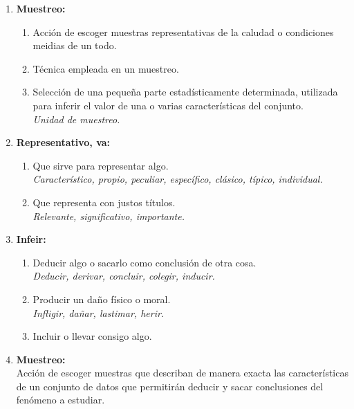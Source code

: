 \begin{enumerate}
\item \textbf{Muestreo: }
    \begin{enumerate}
        \item Acción de escoger muestras representativas de la caludad o condiciones meidias de un todo.
        \item Técnica empleada en un muestreo.
        \item Selección de una pequeña parte estadísticamente determinada, utilizada para inferir el valor de una o varias características del conjunto.
        \\ \textit{Unidad de muestreo.}
        \\ \cite{DiapositivasSema-4-04}
    \end{enumerate}

\item \textbf{Representativo, va: }
\begin{enumerate}
    \item Que sirve para representar algo.
    \\ \textit{Característico, propio, peculiar, específico, clásico, típico, individual.}
    \item Que representa con justos títulos.
    \\ \textit{Relevante, significativo, importante.}
    \\ \cite{RAE}
\end{enumerate}

\item \textbf{Infeir: }
\begin{enumerate}
    \item Deducir algo o sacarlo como conclusión de otra cosa.
    \\\textit{Deducir, derivar, concluir, colegir, inducir.}
    \item Producir un daño físico o moral.
    \\ \textit{Infligir, dañar, lastimar, herir.}
    \item Incluir o llevar consigo algo.
    \\ \cite{RAE}
\end{enumerate}

\item \textbf{Muestreo: }
    \\Acción de escoger muestras que describan de manera exacta las características de un conjunto de datos que permitirán deducir y sacar conclusiones del fenómeno a estudiar.
    \\ \cite{DiapositivasSema-4-04}


\end{enumerate}
